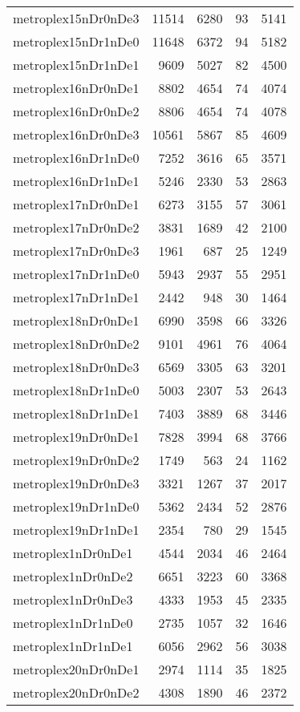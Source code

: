 \documentclass[../../../thesis.tex]{subfiles}
\begin{document}
\begin{longtable}{lrrrr}
metroplex15nDr0nDe3 & 11514 & 6280 & 93 & 5141 \\
metroplex15nDr1nDe0 & 11648 & 6372 & 94 & 5182 \\
metroplex15nDr1nDe1 & 9609 & 5027 & 82 & 4500 \\
metroplex16nDr0nDe1 & 8802 & 4654 & 74 & 4074 \\
metroplex16nDr0nDe2 & 8806 & 4654 & 74 & 4078 \\
metroplex16nDr0nDe3 & 10561 & 5867 & 85 & 4609 \\
metroplex16nDr1nDe0 & 7252 & 3616 & 65 & 3571 \\
metroplex16nDr1nDe1 & 5246 & 2330 & 53 & 2863 \\
metroplex17nDr0nDe1 & 6273 & 3155 & 57 & 3061 \\
metroplex17nDr0nDe2 & 3831 & 1689 & 42 & 2100 \\
metroplex17nDr0nDe3 & 1961 & 687 & 25 & 1249 \\
metroplex17nDr1nDe0 & 5943 & 2937 & 55 & 2951 \\
metroplex17nDr1nDe1 & 2442 & 948 & 30 & 1464 \\
metroplex18nDr0nDe1 & 6990 & 3598 & 66 & 3326 \\
metroplex18nDr0nDe2 & 9101 & 4961 & 76 & 4064 \\
metroplex18nDr0nDe3 & 6569 & 3305 & 63 & 3201 \\
metroplex18nDr1nDe0 & 5003 & 2307 & 53 & 2643 \\
metroplex18nDr1nDe1 & 7403 & 3889 & 68 & 3446 \\
metroplex19nDr0nDe1 & 7828 & 3994 & 68 & 3766 \\
metroplex19nDr0nDe2 & 1749 & 563 & 24 & 1162 \\
metroplex19nDr0nDe3 & 3321 & 1267 & 37 & 2017 \\
metroplex19nDr1nDe0 & 5362 & 2434 & 52 & 2876 \\
metroplex19nDr1nDe1 & 2354 & 780 & 29 & 1545 \\
metroplex1nDr0nDe1 & 4544 & 2034 & 46 & 2464 \\
metroplex1nDr0nDe2 & 6651 & 3223 & 60 & 3368 \\
metroplex1nDr0nDe3 & 4333 & 1953 & 45 & 2335 \\
metroplex1nDr1nDe0 & 2735 & 1057 & 32 & 1646 \\
metroplex1nDr1nDe1 & 6056 & 2962 & 56 & 3038 \\
metroplex20nDr0nDe1 & 2974 & 1114 & 35 & 1825 \\
metroplex20nDr0nDe2 & 4308 & 1890 & 46 & 2372 \\

\end{longtable}
\end{document}
